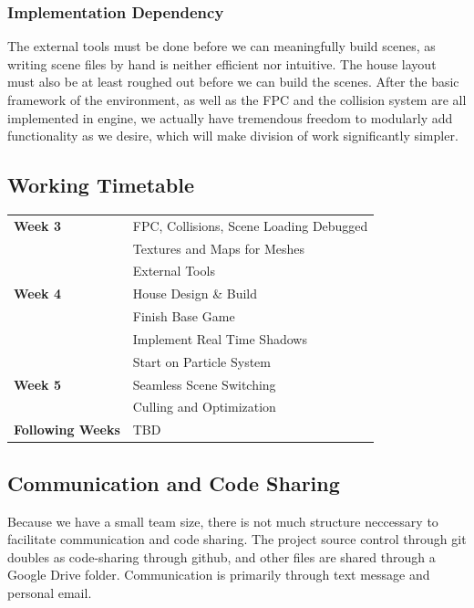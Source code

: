 \documentclass[11pt]{article} %
\begin{document}
\subsubsection*{Implementation Dependency}
The external tools must be done before we can meaningfully build scenes, as writing scene files by hand is neither efficient nor intuitive. The house layout must also be at least roughed out before we can build the scenes. After the basic framework of the environment, as well as the FPC and the collision system are all implemented in engine, we actually have tremendous freedom to modularly add functionality as we desire, which will make division of work significantly simpler.
\renewcommand{\arraystretch}{1.4}
\subsection{Working Timetable}
\begin{tabular}{|l || l |}
\hline
\textbf{Week 3} & FPC, Collisions, Scene Loading Debugged\\
& Textures and Maps for Meshes \\
& External Tools \\
\hline
\textbf{Week 4} & House Design \& Build\\
		& Finish Base Game \\
		& Implement Real Time Shadows\\
		& Start on Particle System\\
\hline
\textbf{Week 5} & Seamless Scene Switching \\
 & Culling and Optimization \\
 \hline
\textbf{Following Weeks} & TBD\\
\hline
\end{tabular}

\subsection{Communication and Code Sharing}
Because we have a small team size, there is not much structure neccessary to facilitate communication and code sharing. The project source control through git doubles as 
code-sharing through github, and other files are shared through a Google Drive folder. Communication is primarily through text message and personal email.
\end{document}
